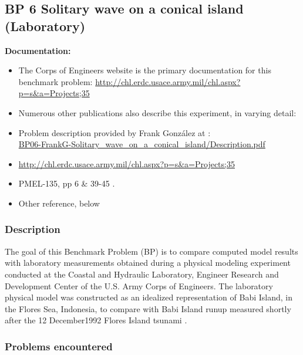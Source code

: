 \subsection{BP 6
  Solitary wave on a conical island (Laboratory)}

{\bf Documentation:}
\begin {itemize}


\item The Corps of Engineers website is the primary documentation for this benchmark problem:
\url{http://chl.erdc.usace.army.mil/chl.aspx?p=s&a=Projects;35}
\item Numerous other publications also describe this experiment, in varying detail: \cite{SynolakisBernard:pmel135, Briggs1994, Liu1994, Briggs1995, Liu1995, Briggs1996, Fujima2000}

\item Problem description provided by Frank Gonz\'alez 
 at \cite{bp-description}:\\
\href{https://github.com/rjleveque/nthmp-benchmark-problems/blob/master/BP06-FrankG-Solitary_wave_on_a_conical_island/Description.pdf}
{BP06-FrankG-Solitary\_wave\_on\_a\_conical\_island/Description.pdf} 
\item \url{http://chl.erdc.usace.army.mil/chl.aspx?p=s&a=Projects;35}
\item PMEL-135, pp 6 \& 39-45 \cite{SynolakisBernard:pmel135}.
\item Other reference, below
\end{itemize} 

\subsubsection{Description}
The goal of this Benchmark Problem (BP) is to compare computed model results with laboratory measurements obtained during a physical modeling experiment conducted at the Coastal and Hydraulic Laboratory, Engineer Research and Development Center of the U.S. Army Corps of Engineers.  The laboratory physical model was constructed as an idealized representation of Babi Island, in the Flores Sea, Indonesia, to compare with Babi Island runup measured shortly after the 12 December1992 Flores Island tsunami \cite{Yeh1994}.

\subsubsection {Problems encountered}

